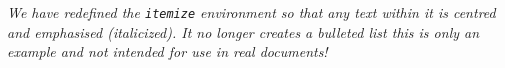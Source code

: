 \documentclass{article}
\renewenvironment{itemize}
{\begin{center}\em}
	{\end{center}}
\begin{document}
	
	\begin{itemize}
		We have redefined the \texttt{itemize} environment so that any text 
		within it is centred and emphasised (italicized). It no longer creates
		a bulleted list this is only an example and not intended for use 
		in real documents!
	\end{itemize}
\end{document}

